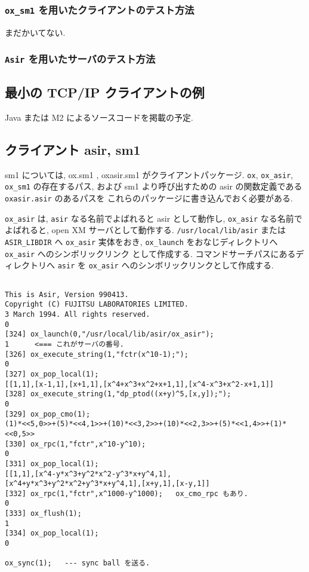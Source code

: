\subsubsection{ {\tt ox\_sm1} を用いたクライアントのテスト方法 }
まだかいてない.

\subsubsection{ {\tt Asir} を用いたサーバのテスト方法 }

\subsection{ 最小の TCP/IP クライアントの例 }

Java または M2 によるソースコードを掲載の予定.

\subsection{ クライアント asir, sm1 }

sm1 については, ox.sm1 , oxasir.sm1 がクライアントパッケージ.
{\tt ox}, {\tt ox\_asir}, {\tt ox\_sm1} の存在するパス,
および sm1 より呼び出すための asir の関数定義である
{\tt oxasir.asir} のあるパスを
これらのパッケージに書き込んでおく必要がある.

{\tt ox\_asir} は, {\tt asir} なる名前でよばれると
asir として動作し, {\tt ox\_asir} なる名前でよばれると,
open XM サーバとして動作する.
{\tt /usr/local/lib/asir} または
{\tt ASIR\_LIBDIR} へ {\tt ox\_asir} 実体をおき,
{\tt ox\_launch} をおなじディレクトリへ {\tt ox\_asir} へのシンボリックリンク
として作成する.
コマンドサーチパスにあるディレクトリへ {\tt asir} を {\tt ox\_asir}
へのシンボリックリンクとして作成する.
{\footnotesize
\begin{verbatim}

This is Asir, Version 990413.
Copyright (C) FUJITSU LABORATORIES LIMITED.
3 March 1994. All rights reserved.
0
[324] ox_launch(0,"/usr/local/lib/asir/ox_asir");
1      <=== これがサーバの番号.
[326] ox_execute_string(1,"fctr(x^10-1);");
0
[327] ox_pop_local(1);
[[1,1],[x-1,1],[x+1,1],[x^4+x^3+x^2+x+1,1],[x^4-x^3+x^2-x+1,1]]
[328] ox_execute_string(1,"dp_ptod((x+y)^5,[x,y]);");
0
[329] ox_pop_cmo(1);
(1)*<<5,0>>+(5)*<<4,1>>+(10)*<<3,2>>+(10)*<<2,3>>+(5)*<<1,4>>+(1)*<<0,5>>
[330] ox_rpc(1,"fctr",x^10-y^10);
0
[331] ox_pop_local(1);
[[1,1],[x^4-y*x^3+y^2*x^2-y^3*x+y^4,1],[x^4+y*x^3+y^2*x^2+y^3*x+y^4,1],[x+y,1],[x-y,1]]
[332] ox_rpc(1,"fctr",x^1000-y^1000);   ox_cmo_rpc もあり.
0
[333] ox_flush(1);
1
[334] ox_pop_local(1);
0

ox_sync(1);   --- sync ball を送る.

\end{verbatim}}


